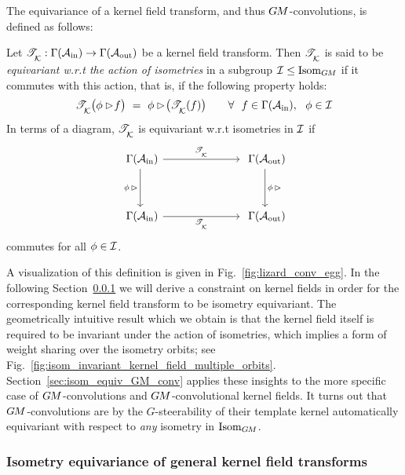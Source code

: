 The equivariance of a kernel field transform, and thus $G\mkern-1.4muM$-convolutions, is defined as follows:
\begin{dfn}
\label{dfn:isometry_equivariance}
    Let ${\mathscr{T}_{\overset{}{\mkern-0mu \mathcal{K}}}: \Gamma(\mathcal{A}_\textup{in}) \to \Gamma(\mathcal{A}_\textup{out})}$ be a kernel field transform.
    Then $\mathscr{T}_{\overset{}{\mkern-0mu \mathcal{K}}}$ is said to be \emph{equivariant w.r.t the action of isometries} in a subgroup $\mathcal{I} \leq \operatorname{Isom}_{G\mkern-1.4muM}$ if it commutes with this action, that is, if the following property holds:
    \begin{align}\label{eq:isom_equivariance_kernel_field_trafo_def}
        \mathscr{T}_{\overset{}{\mkern-0mu \mathcal{K}}} \big( \phi\rhd\!f \big) \ =\ \phi\rhd\! \big( \mathscr{T}_{\overset{}{\mkern-0mu \mathcal{K}}}(f) \big)
        \qquad \forall\ \ f\in\Gamma(\mathcal{A}_\textup{in}), \ \ \phi\in \mathcal{I}
    \end{align}
    In terms of a diagram, $\mathscr{T}_{\overset{}{\mkern-0mu \mathcal{K}}}$ is equivariant w.r.t isometries in $\mathcal{I}$ if
    \begin{equation}
    \begin{tikzcd}[column sep=70pt, row sep=35, font=\normalsize]
        \Gamma(\Ain)
            \arrow[r, "\TK"]
            \arrow[d, "\phi\,\rhd"']
        &
        \Gamma(\Aout)
            \arrow[d, "\phi\,\rhd"]
        \\
        \Gamma(\Ain)
            \arrow[r, "\TK"']
        &
        \Gamma(\Aout)
    \end{tikzcd}
    \end{equation}
    commutes for all $\phi \in \mathcal{I}$.
\end{dfn}
A visualization of this definition is given in Fig.~\ref{fig:lizard_conv_egg}.
In the following Section~\ref{sec:isometry_constraint} we will derive a constraint on kernel fields in order for the corresponding kernel field transform to be isometry equivariant.
The geometrically intuitive result which we obtain is that the kernel field itself is required to be invariant under the action of isometries, which implies a form of weight sharing over the isometry orbits; see Fig.~\ref{fig:isom_invariant_kernel_field_multiple_orbits}.
Section~\ref{sec:isom_equiv_GM_conv} applies these insights to the more specific case of $G\mkern-1.4muM$-convolutions and $G\mkern-1.4muM$-convolutional kernel fields.
It turns out that $G\mkern-1.4muM$-convolutions are by the $G$-steerability of their template kernel automatically equivariant with respect to \emph{any} isometry in $\operatorname{Isom}_{G\mkern-1.4muM}$.








\subsubsection{Isometry equivariance of general kernel field transforms}
\label{sec:isometry_constraint}

